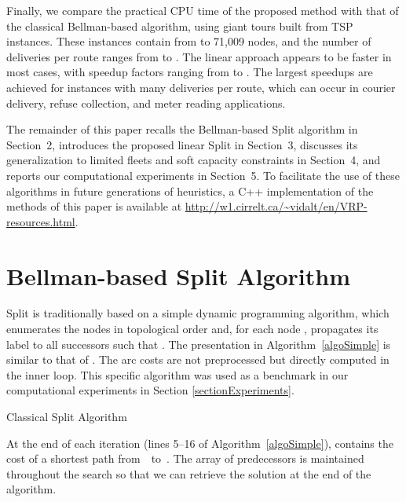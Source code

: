 \documentclass[11pt]{article}
\begin{document}
Finally, we compare the practical CPU time of the proposed method with that of the classical Bellman-based algorithm, using giant tours built from TSP instances. These instances contain from  to 71,009 nodes, and the number of deliveries per route ranges from  to .  The linear approach appears to be faster in most cases, with speedup factors ranging from  to . The largest speedups are achieved for instances with many deliveries per route, which can occur in courier delivery, refuse collection, and meter reading applications.

The remainder of this paper recalls the Bellman-based Split algorithm in Section~2, introduces the proposed linear Split in Section~3, discusses its generalization to limited fleets and soft capacity constraints in Section~4, and reports our computational experiments in Section~5. To facilitate the use of these algorithms in future generations of heuristics, a C++ implementation of the methods of this paper is available at \url{http://w1.cirrelt.ca/\~vidalt/en/VRP-resources.html}. 

\section{Bellman-based Split Algorithm}
\label{sectionBellman}

Split is traditionally based on a simple dynamic programming algorithm, which enumerates the nodes in topological order and, for each node , propagates its label to all successors  such that . The presentation in Algorithm~\ref{algoSimple} is similar to that of \cite{Prins2004}. The arc costs are not preprocessed but directly computed in the inner loop. This specific algorithm was used as a benchmark in our computational experiments in Section \ref{sectionExperiments}.

\begin{algorithm}[htbp]
 \;
{
	 \;
}
{ 
	 \;
	 \;
	{ 
		 \;
		\If{}
		{
			 \;
		}
		\Else
		{
			 \;
		}
     	  	 \If{}
		{
			 \;
            	         \;
		}
		 \;
	}
}
\caption{Classical Split Algorithm} 
\label{algoSimple} 
\end{algorithm}

At the end of each iteration  (lines 5--16 of Algorithm~\ref{algoSimple}),  contains the cost of a shortest path from~~to~. The array of predecessors  is maintained throughout the search so that we can retrieve the solution at the end of the algorithm.
\end{document}
